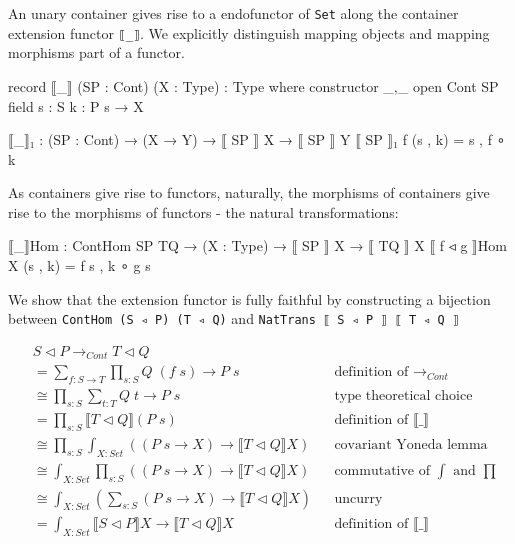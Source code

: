 An unary container gives rise to a endofunctor of \texttt{Set} along the container extension functor \texttt{⟦\_⟧}. We explicitly distinguish mapping objects and mapping morphisms part of a functor.

\begin{code}
record ⟦_⟧ (SP : Cont) (X : Type) : Type where
  constructor _,_
  open Cont SP
  field
    s : S
    k : P s → X

⟦_⟧₁ : (SP : Cont) → (X → Y) → ⟦ SP ⟧ X → ⟦ SP ⟧ Y
⟦ SP ⟧₁ f (s , k) = s , f ∘ k
\end{code}

As containers give rise to functors, naturally, the morphisms of containers give rise to the morphisms of functors - the natural transformations:

\begin{code}
⟦_⟧Hom : ContHom SP TQ → (X : Type) → ⟦ SP ⟧ X → ⟦ TQ ⟧ X
⟦ f ◃ g ⟧Hom X (s , k) = f s , k ∘ g s
\end{code}

We show that the extension functor is fully faithful by constructing a bijection between \texttt{ContHom (S ◃ P) (T ◃ Q)} and \texttt{NatTrans ⟦ S ◃ P ⟧ ⟦ T ◃ Q ⟧}

\begin{align*}
& S \triangleleft P \rightarrow_{Cont} T \triangleleft Q \\
&= \sum_{f : S \rightarrow T} \prod_{s : S} Q \; (f \; s) \rightarrow P \; s && \text{definition of $\rightarrow_{Cont}$} \\
&\cong \prod_{s : S} \sum_{t : T} Q \; t \rightarrow P \; s && \text{type theoretical choice} \\
&= \prod_{s : S} \llbracket T \triangleleft Q \rrbracket (P \; s) && \text{definition of $\llbracket \_ \rrbracket$} \\
&\cong \prod_{s : S} \int_{X : Set} ((P \; s \rightarrow X) \rightarrow \llbracket T \triangleleft Q \rrbracket X) && \text{covariant Yoneda lemma} \\
&\cong \int_{X : Set} \prod_{s : S} ((P \; s \rightarrow X) \rightarrow \llbracket T \triangleleft Q \rrbracket X) && \text{commutative of $\int$ and $\prod$} \\
&\cong \int_{X : Set} (\sum_{s : S} (P \; s \rightarrow X) \rightarrow \llbracket T \triangleleft Q \rrbracket X) && \text{uncurry} \\
&= \int_{X : Set} \llbracket S \triangleleft P \rrbracket X \rightarrow \llbracket T \triangleleft Q \rrbracket X && \text{definition of $\llbracket \_ \rrbracket$} \\
\end{align*}

